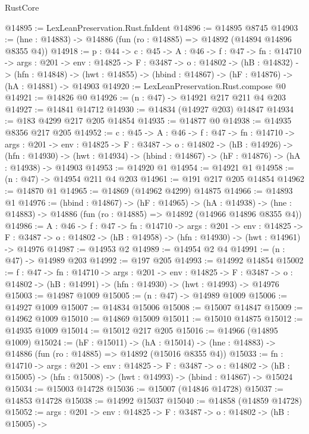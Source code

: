 \begin{lexlean}{RustCore}
\begin{coremodule}
@14895 := LexLeanPreservation.Rust.fnIdent
@14896 := @14895 @8745
@14903 := (hne : @14883) -> @14886 (fun (ro : @14885) => @14892 (@14894 @14896 @8355 @4))
@14918 := {p : @44} ->
  {c : @45} ->
  {A : @46} ->
  {f : @47} ->
  {fn : @14710} ->
  {args : @201} ->
  {env : @14825} ->
  {F : @3487} ->
  {o : @14802} ->
  (hB : @14832) ->
  (hfn : @14848) -> (hwt : @14855) -> (hbind : @14867) -> (hF : @14876) -> (hA : @14881) -> @14903
@14920 := LexLeanPreservation.Rust.compose @0
@14921 := @14826 @0
@14926 := (n : @47) -> @14921 @217 @211 @4 @203
@14927 := @14841 @14712
@14930 := @14834 (@14927 @203) @14847
@14934 := @183 @4299 @217 @205 @14854
@14935 := @14877 @0
@14938 := @14935 @8356 @217 @205
@14952 := {c : @45} ->
  {A : @46} ->
  {f : @47} ->
  {fn : @14710} ->
  {args : @201} ->
  {env : @14825} ->
  {F : @3487} ->
  {o : @14802} ->
  (hB : @14926) ->
  (hfn : @14930) -> (hwt : @14934) -> (hbind : @14867) -> (hF : @14876) -> (hA : @14938) -> @14903
@14953 := @14920 @1
@14954 := @14921 @1
@14958 := (n : @47) -> @14954 @211 @4 @203
@14961 := @191 @217 @205 @14854
@14962 := @14870 @1
@14965 := @14869 (@14962 @4299) @14875
@14966 := @14893 @1
@14976 := (hbind : @14867) ->
  (hF : @14965) ->
  (hA : @14938) -> (hne : @14883) -> @14886 (fun (ro : @14885) => @14892 (@14966 @14896 @8355 @4))
@14986 := {A : @46} ->
  {f : @47} ->
  {fn : @14710} ->
  {args : @201} ->
  {env : @14825} ->
  {F : @3487} -> {o : @14802} -> (hB : @14958) -> (hfn : @14930) -> (hwt : @14961) -> @14976
@14987 := @14953 @2
@14989 := @14954 @2 @4
@14991 := (n : @47) -> @14989 @203
@14992 := @197 @205
@14993 := @14992 @14854
@15002 := {f : @47} ->
  {fn : @14710} ->
  {args : @201} ->
  {env : @14825} ->
  {F : @3487} -> {o : @14802} -> (hB : @14991) -> (hfn : @14930) -> (hwt : @14993) -> @14976
@15003 := @14987 @1009
@15005 := (n : @47) -> @14989 @1009
@15006 := @14927 @1009
@15007 := @14834 @15006
@15008 := @15007 @14847
@15009 := @14962 @1009
@15010 := @14869 @15009
@15011 := @15010 @14875
@15012 := @14935 @1009
@15014 := @15012 @217 @205
@15016 := @14966 (@14895 @1009)
@15024 := (hF : @15011) ->
  (hA : @15014) -> (hne : @14883) -> @14886 (fun (ro : @14885) => @14892 (@15016 @8355 @4))
@15033 := {fn : @14710} ->
  {args : @201} ->
  {env : @14825} ->
  {F : @3487} ->
  {o : @14802} -> (hB : @15005) -> (hfn : @15008) -> (hwt : @14993) -> (hbind : @14867) -> @15024
@15034 := @15003 @14728
@15036 := @15007 (@14846 @14728)
@15037 := @14853 @14728
@15038 := @14992 @15037
@15040 := @14858 (@14859 @14728)
@15052 := {args : @201} ->
  {env : @14825} ->
  {F : @3487} ->
  {o : @14802} ->
  (hB : @15005) ->

\end{coremodule}
\end{lexlean}
